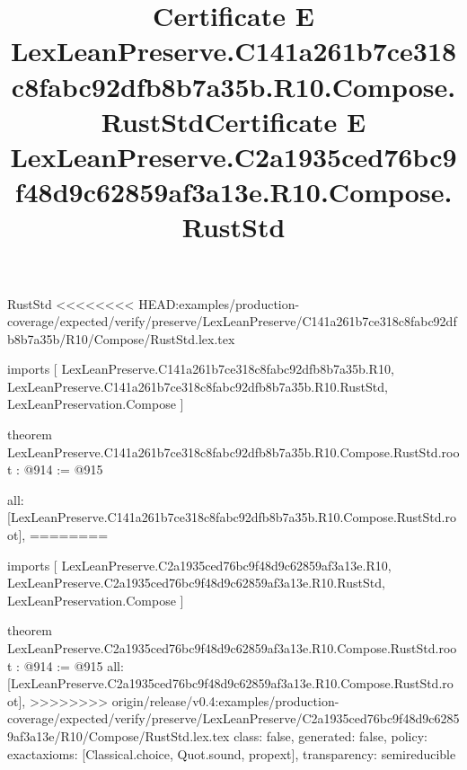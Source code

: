 \begin{lexlean}{RustStd}
<<<<<<<< HEAD:examples/production-coverage/expected/verify/preserve/LexLeanPreserve/C141a261b7ce318c8fabc92dfb8b7a35b/R10/Compose/RustStd.lex.tex
\title{Certificate E LexLeanPreserve.C141a261b7ce318c8fabc92dfb8b7a35b.R10.Compose.RustStd}
\begin{coremodule}
imports [
  LexLeanPreserve.C141a261b7ce318c8fabc92dfb8b7a35b.R10,
  LexLeanPreserve.C141a261b7ce318c8fabc92dfb8b7a35b.R10.RustStd,
  LexLeanPreservation.Compose
]

theorem LexLeanPreserve.C141a261b7ce318c8fabc92dfb8b7a35b.R10.Compose.RustStd.root : @914 := @915 {
  all: [LexLeanPreserve.C141a261b7ce318c8fabc92dfb8b7a35b.R10.Compose.RustStd.root],
========
\title{Certificate E LexLeanPreserve.C2a1935ced76bc9f48d9c62859af3a13e.R10.Compose.RustStd}
\begin{coremodule}
imports [
  LexLeanPreserve.C2a1935ced76bc9f48d9c62859af3a13e.R10,
  LexLeanPreserve.C2a1935ced76bc9f48d9c62859af3a13e.R10.RustStd,
  LexLeanPreservation.Compose
]

theorem LexLeanPreserve.C2a1935ced76bc9f48d9c62859af3a13e.R10.Compose.RustStd.root : @914 := @915 {
  all: [LexLeanPreserve.C2a1935ced76bc9f48d9c62859af3a13e.R10.Compose.RustStd.root],
>>>>>>>> origin/release/v0.4:examples/production-coverage/expected/verify/preserve/LexLeanPreserve/C2a1935ced76bc9f48d9c62859af3a13e/R10/Compose/RustStd.lex.tex
  class: false,
  generated: false,
  policy: exact{axioms: [Classical.choice, Quot.sound, propext]},
  transparency: semireducible
}


\end{coremodule}}
\end{coremodule}
\end{lexlean}
